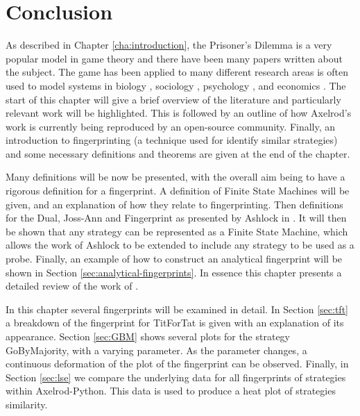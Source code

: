 
\chapter{Conclusion}\label{cha:conclusion}

As described in Chapter \ref{cha:introduction}, the Prisoner's Dilemma is a very popular model in game theory and there have been many papers written about the subject.
The game has been applied to many different research areas is often used to model systems in biology \cite{Sigmund1999}, sociology \cite{Franken2005}, psychology \cite{Ishibuchi2005}, and economics \cite{Chong2005}.
The start of this chapter will give a brief overview of the literature and particularly relevant work will be highlighted.
This is followed by an outline of how Axelrod's work is currently being reproduced by an open-source community.
Finally, an introduction to fingerprinting (a technique used for identify
similar strategies) and some necessary definitions and theorems are given at the end of the chapter.

Many definitions will be now be presented, with the overall aim being to have a rigorous definition for a fingerprint.
A definition of Finite State Machines will be given, and an explanation of how they relate to fingerprinting.
Then definitions for the Dual, Joss-Ann and Fingerprint as presented by Ashlock in \cite{Ashlock2004}.
It will then be shown that any strategy can be represented as a Finite State Machine, which allows the work of Ashlock to be extended to include any strategy to be used as a probe.
Finally, an example of how to construct an analytical fingerprint will be shown in Section \ref{sec:analytical-fingerprints}.
In essence this chapter presents a detailed review of the work of \cite{Ashlock2008, Ashlock2010, Ashlock2004,  Ashlock2005, Ashlock2009, Ashlock2006}.

In this chapter several fingerprints will be examined in detail.
In Section \ref{sec:tft} a breakdown of the fingerprint for TitForTat is given with an explanation of its appearance.
Section \ref{sec:GBM} shows several plots for the strategy GoByMajority, with a varying parameter.
As the parameter changes, a continuous deformation of the plot of the
fingerprint can be observed.
Finally, in Section \ref{sec:lse} we compare the underlying data for all fingerprints of strategies within Axelrod-Python.
This data is used to produce a heat plot of strategies similarity.
